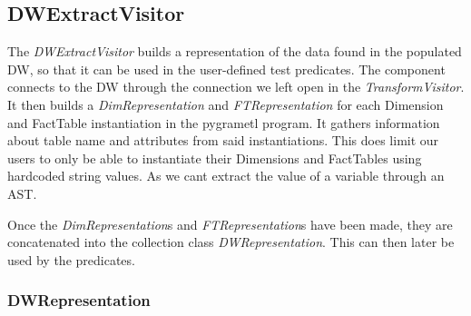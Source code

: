 \subsection{DWExtractVisitor}
The \textit{DWExtractVisitor} builds a representation of the data found in the populated DW, so that it can be used in the user-defined test predicates. The component connects to the DW through the connection we left open in the \textit{TransformVisitor}. It then builds a \textit{DimRepresentation} and \textit{FTRepresentation} for each Dimension and FactTable instantiation in the pygrametl program. It gathers information about table name and attributes from said instantiations. This does limit our users to only be able to instantiate their Dimensions and FactTables using hardcoded string values. As we cant extract the value of a variable through an AST. 

Once the \textit{DimRepresentation}s and \textit{FTRepresentation}s have been made, they are concatenated into the collection class \textit{DWRepresentation}. This can then later be used by the predicates.

\subsubsection{DWRepresentation}
